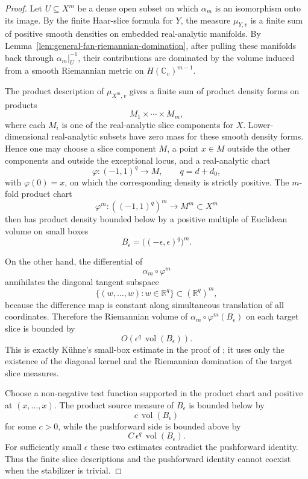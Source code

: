 \documentclass[10pt,a4paper]{amsart}
\theoremstyle{plain}
\theoremstyle{plain}
\numberwithin{equation}{section}
\begin{document}
\begin{proof}
	Let \(U\subseteq X^m\) be a dense open subset on which
	\(\alpha_m\) is an isomorphism onto its image.  By the finite Haar-slice
	formula for \(Y\), the measure \(\mu_{Y,v}\) is a finite sum of positive smooth
	densities on embedded real-analytic manifolds.  By
	Lemma~\ref{lem:general-fan-riemannian-domination}, after pulling these
	manifolds back through \(\alpha_m|_U^{-1}\), their contributions are dominated
	by the volume induced from a smooth Riemannian metric on
	\(H(\mathbb C_v)^{m-1}\).
	
	The product description of \(\mu_{X^m,v}\) gives a finite sum of product
	density forms on products
	\[
	M_1\times\cdots\times M_m,
	\]
	where each \(M_i\) is one of the real-analytic slice components for \(X\).
	Lower-dimensional real-analytic subsets have zero mass for these smooth
	density forms.  Hence one may choose a slice component \(M\), a point
	\(x\in M\) outside the other components and outside the exceptional locus, and
	a real-analytic chart
	\[
	\varphi:(-1,1)^q\longrightarrow M,\qquad q=d+d_0,
	\]
	with \(\varphi(0)=x\), on which the corresponding density is strictly
	positive.  The \(m\)-fold product chart
	\[
	\varphi^m:((-1,1)^q)^m\longrightarrow M^m\subset X^m
	\]
	then has product density bounded below by a positive multiple of Euclidean
	volume on small boxes
	\[
	B_\epsilon=\bigl((-\epsilon,\epsilon)^q\bigr)^m .
	\]
	
	On the other hand, the differential of
	\[
	\alpha_m\circ\varphi^m
	\]
	annihilates the diagonal tangent subspace
	\[
	\{(w,\ldots,w):w\in\mathbb R^q\}\subset(\mathbb R^q)^m,
	\]
	because the difference map is constant along simultaneous translation of all
	coordinates.  Therefore the Riemannian volume of
	\(\alpha_m\circ\varphi^m(B_\epsilon)\) on each target slice is bounded by
	\[
	O(\epsilon^q\,\operatorname{vol}(B_\epsilon)).
	\]
	This is exactly K\"uhne's small-box estimate in the proof of
	\cite[Proposition~6.1]{Ku1}; it uses only the existence of the diagonal kernel
	and the Riemannian domination of the target slice measures.
	
	Choose a non-negative test function supported in the product chart and positive
	at \((x,\ldots,x)\).  The product source measure of \(B_\epsilon\) is bounded
	below by
	\[
	c\,\operatorname{vol}(B_\epsilon)
	\]
	for some \(c>0\), while the pushforward side is bounded above by
	\[
	C\,\epsilon^q\,\operatorname{vol}(B_\epsilon).
	\]
	For sufficiently small \(\epsilon\) these two estimates contradict the
	pushforward identity.  Thus the finite slice descriptions and the pushforward
	identity cannot coexist when the stabilizer is trivial.
\end{proof}
\end{document}
